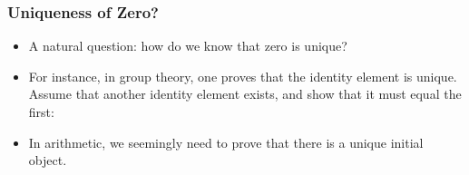 \begin{frame}
\frametitle{Uniqueness of Zero?}

\begin{itemize}[<+->]

\item A natural question: how do we know that zero is unique?

\item For instance, in group theory, one proves that the identity element is unique. Assume that another identity element exists, and show that it must equal the first:

\item In arithmetic, we seemingly need to prove that there is a unique initial object. 





\end{itemize}
\end{frame}
\fi 